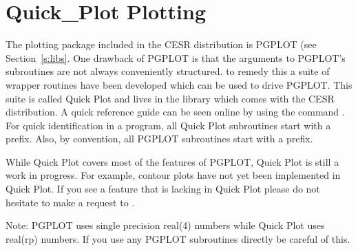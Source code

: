\chapter{Quick\_Plot Plotting}
\label{c:quick_plot}

The plotting package included in the CESR distribution is PGPLOT
(see Section~\ref{s:libs}.
One drawback of PGPLOT is that the arguments to
PGPLOT's subroutines are not always conveniently structured. to remedy
this a suite of wrapper routines have been developed which can be
used to drive PGPLOT. This suite is called Quick Plot and lives in the
 library which comes with the CESR distribution. A quick
reference guide can be seen online by using the command . For quick identification in a program, all Quick Plot
subroutines start with a  prefix. Also, by convention, all
PGPLOT subroutines start with a  prefix.

While Quick Plot covers most of the features of PGPLOT, Quick Plot is
still a work in progress.  For example, contour plots have not yet
been implemented in Quick Plot. If you see a feature that is lacking
in Quick Plot please do not hesitate to make a request to
.

Note: PGPLOT uses single precision real(4) numbers while Quick Plot
uses real(rp) numbers.  If you use any PGPLOT subroutines directly be
careful of this.


